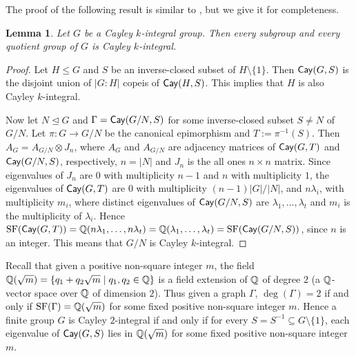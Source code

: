 \documentclass{amsart}
\newtheorem{lem}[thm]{Lemma}
\def \leq {\leqslant}
\def\Cay{{\sf Cay}} \def\Ker{{\sf Ker}}
\begin{document}
The proof of the following result is similar to \cite[Lemma 4.3]{Azhvan}, but we give it for completeness.
\begin{lem}\label{sbg-qoutient}
	Let $G$ be a Cayley $k$-integral group. Then every subgroup and every quotient group of $G$ is Cayley $k$-integral. 
\end{lem}
\begin{proof}
Let $H\leq G$ and $S$ be an inverse-closed subset of $H\setminus\{1\}$. Then $\Cay(G,S)$ is the disjoint union of  $|G:H|$ copeis of $\Cay(H,S)$. This implies that $H$ is also Cayley $k$-integral.

Now let $N\unlhd G$ and $\Gamma=\Cay(G/N,S)$ for some inverse-closed subset $S\neq N$ of $G/N$. Let $\pi:G\rightarrow G/N$ be the canonical epimorphism and $T:=\pi^{-1}(S)$. Then $A_G=A_{G/N}\otimes J_n$, where $A_G$ and $A_{G/N}$ are adjacency matrices of $\Cay(G,T)$ and $\Cay(G/N,S)$, respectively, $n=|N|$ and $J_n$ is the all ones $n\times n$ matrix. Since eigenvalues of $J_n$ are $0$ with multiplicity $n-1$ and $n$ with multiplicity $1$, the eigenvalues of $\Cay(G,T)$ are $0$ with multiplicity $(n-1)|G|/|N|$, and $n\lambda_i$,  with multiplicity $m_i$, where distinct eigenvalues of $\Cay(G/N,S)$ are $\lambda_1,\ldots,\lambda_t$ and $m_i$ is the multiplicity of $\lambda_i$. Hence $\textrm{SF}(\Cay(G,T))=\Bbb Q(n\lambda_1,\ldots,n\lambda_t)=\Bbb Q(\lambda_1,\ldots,\lambda_t)=\textrm{SF}(\Cay(G/N,S))$, since $n$ is an integer. This means that $G/N$ is Cayley $k$-integral.
\end{proof}

Recall that given a positive non-square integer $m$, the field $\Bbb Q(\sqrt{m})=\{q_1+q_2\sqrt{m}\mid q_1,q_2\in\Bbb Q\}$ is a field extension of $\Bbb Q$ of degree $2$ (a $\Bbb Q$-vector space over $\Bbb Q$ of dimension $2$). Thus given a graph $\Gamma$, $\deg(\Gamma)=2$ if and only if $\textrm{SF}(\Gamma)=\Bbb Q(\sqrt{m})$ for some fixed positive non-square integer $m$. Hence a finite group $G$
is Cayley $2$-integral if and only if for every $S=S^{-1}\subseteq G\setminus\{1\}$, each eigenvalue of $\Cay(G,S)$ lies in $\Bbb Q(\sqrt{m})$ for some fixed positive non-square integer $m$. 
\end{document}

